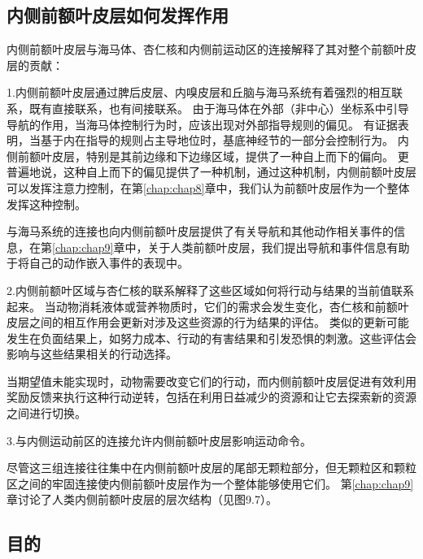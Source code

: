\subsection{内侧前额叶皮层如何发挥作用}

内侧前额叶皮层与海马体、杏仁核和内侧前运动区的连接解释了其对整个前额叶皮层的贡献：\par

1.内侧前额叶皮层通过脾后皮层、内嗅皮层和丘脑与海马系统有着强烈的相互联系，既有直接联系，也有间接联系。
由于海马体在外部（非中心）坐标系中引导导航的作用，当海马体控制行为时，应该出现对外部指导规则的偏见。
有证据表明，当基于内在指导的规则占主导地位时，基底神经节的一部分会控制行为\cite{packard1996inactivation}。
内侧前额叶皮层，特别是其前边缘和下边缘区域，提供了一种自上而下的偏向。
更普遍地说，这种自上而下的偏见提供了一种机制，通过这种机制，内侧前额叶皮层可以发挥注意力控制，在第\ref{chap:chap8}章中，我们认为前额叶皮层作为一个整体发挥这种控制。\par


与海马系统的连接也向内侧前额叶皮层提供了有关导航和其他动作相关事件的信息，在第\ref{chap:chap9}章中，关于人类前额叶皮层，我们提出导航和事件信息有助于将自己的动作嵌入事件的表现中。\par


2.内侧前额叶区域与杏仁核的联系解释了这些区域如何将行动与结果的当前值联系起来。
当动物消耗液体或营养物质时，它们的需求会发生变化，杏仁核和前额叶皮层之间的相互作用会更新对涉及这些资源的行为结果的评估。
类似的更新可能发生在负面结果上，如努力成本、行动的有害结果和引发恐惧的刺激。这些评估会影响与这些结果相关的行动选择。\par


当期望值未能实现时，动物需要改变它们的行动，而内侧前额叶皮层促进有效利用奖励反馈来执行这种行动逆转，包括在利用日益减少的资源和让它去探索新的资源之间进行切换。\par


3.与内侧运动前区的连接允许内侧前额叶皮层影响运动命令。\par

尽管这三组连接往往集中在内侧前额叶皮层的尾部无颗粒部分，但无颗粒区和颗粒区之间的牢固连接使内侧前额叶皮层作为一个整体能够使用它们。
第\ref{chap:chap9}章讨论了人类内侧前额叶皮层的层次结构（见图9.7）。\par



\subsection{目的}

